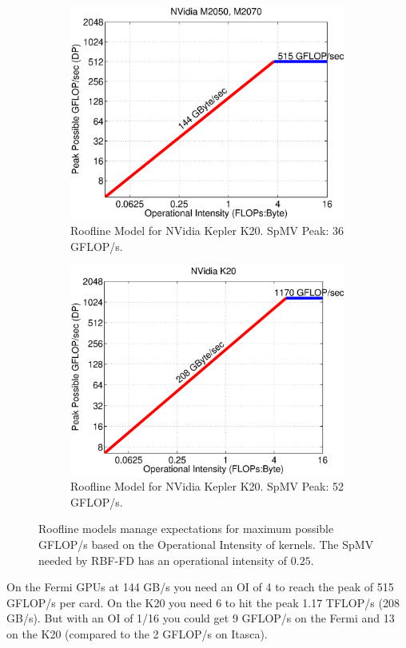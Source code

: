 \documentclass{report}
\begin{document}
\begin{figure} 
\begin{subfigure}{0.5\textwidth}
\centering
\includegraphics[width=\textwidth]{../figures/spmv/roofline_m2050_m2070.eps}
\caption{Roofline Model for NVidia Kepler K20. SpMV Peak: 36 GFLOP/s.}
\label{fig:roofline_k20}
\end{subfigure}
\begin{subfigure}{0.5\textwidth}
\centering
\includegraphics[width=\textwidth]{../figures/spmv/roofline_k20.eps}
\caption{Roofline Model for NVidia Kepler K20. SpMV Peak: 52 GFLOP/s.}
\label{fig:roofline_k20}
\end{subfigure}
\caption{Roofline models manage expectations for maximum possible GFLOP/s based on the Operational Intensity of kernels. The SpMV needed by RBF-FD has an operational intensity of $0.25$. }
\end{figure}

On the Fermi GPUs at 144 GB/s you need an OI of 4 to reach the peak of 515 GFLOP/s per card. On the K20 you need 6 to hit the peak 1.17 TFLOP/s (208 GB/s). But with an OI of 1/16 you could get 9 GFLOP/s on the Fermi and 13 on the K20 (compared to the 2 GFLOP/s on Itasca). 

\ifstandalone


\end{document}
